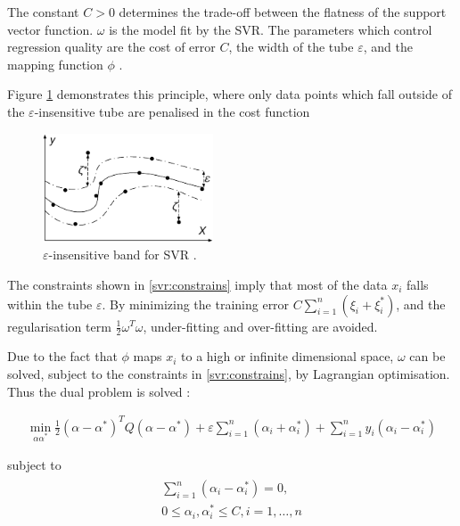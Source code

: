 The constant $C>0$ determines the trade-off between the flatness of the support vector function. $\omega$ is the model fit by the SVR. The parameters which control regression quality are the cost of error $C$, the width of the tube $\varepsilon$, and the mapping function $\phi$ \cite{Shu2006,Chen2004}. 

Figure \ref{fig:insensitive} demonstrates this principle, where only data points which fall outside of the $\varepsilon$-insensitive tube are penalised in the cost function

\begin{figure}[b]
	\includegraphics[width=0.45\textwidth]{figures/Kell_eEnergy_Fig2.eps}
	\caption{$\varepsilon$-insensitive band for SVR \cite{Shu2006}.}
	\label{fig:insensitive}
\end{figure}

The constraints shown in \eqref{svr:constrains} imply that most of the data $x_i$ falls within the tube $\varepsilon$. By minimizing the training error $C\sum_{i=1}^n(\xi_i+\xi_i^*)$, and the regularisation term $\frac{1}{2}\omega^T\omega$, under-fitting and over-fitting are avoided. 

Due to the fact that $\phi$ maps $x_i$ to a high or infinite dimensional space, $\omega$ can be solved, subject to the constraints in \eqref{svr:constrains}, by Lagrangian optimisation. Thus the dual problem is solved \cite{Shu2006,Chen2004,Smola2004}:

\begin{align}
\min_{\alpha\alpha^*}\frac{1}{2}(\alpha-\alpha^*)^TQ(\alpha-\alpha^*)+\varepsilon\sum^n_{i=1}(\alpha_i+\alpha_i^*)+\sum_{i=1}^ny_i(\alpha_i-\alpha_i^*)
\end{align}

\noindent subject to 
\begin{align}
\begin{multlined}
\sum_{i=1}^n(\alpha_i-\alpha_i^*)=0,\\
0\leq\alpha_i,\alpha^*_i\leq C,i=1,\ldots,n
\end{multlined}
\end{align}

